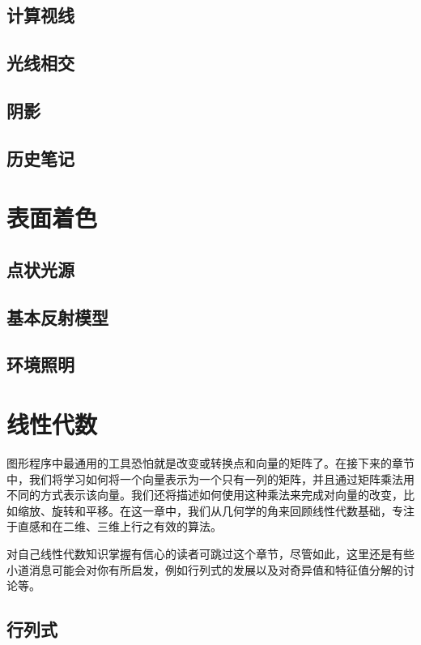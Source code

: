 \documentclass[lang=cn,12pt]{elegantbook}
\begin{document}
\section{计算视线}

\section{光线相交}

\section{阴影}

\section{历史笔记}

\chapter{表面着色}

\section{点状光源}


\section{基本反射模型}


\section{环境照明}

\chapter{线性代数}

图形程序中最通用的工具恐怕就是改变或转换点和向量的矩阵了。在接下来的章节中，我们将学习如何将一个向量表示为一个只有一列的矩阵，并且通过矩阵乘法用不同的方式表示该向量。我们还将描述如何使用这种乘法来完成对向量的改变，比如缩放、旋转和平移。在这一章中，我们从几何学的角来回顾线性代数基础，专注于直感和在二维、三维上行之有效的算法。

对自己线性代数知识掌握有信心的读者可跳过这个章节，尽管如此，这里还是有些小道消息可能会对你有所启发，例如行列式的发展以及对奇异值和特征值分解的讨论等。

\section{行列式}
\end{document}
